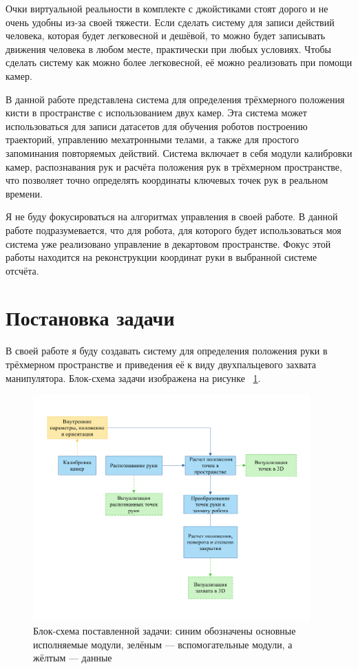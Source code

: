 \documentclass[14pt, a4paper]{extarticle}
\begin{document}
Очки виртуальной реальности в комплекте с джойстиками стоят дорого и не очень
удобны из-за своей тяжести. Если сделать систему для записи действий человека,
которая будет легковесной и дешёвой, то можно будет записывать движения
человека в любом месте, практически при любых условиях. Чтобы сделать систему
как можно более легковесной, её можно реализовать при помощи камер. 

В данной работе представлена система для определения трёхмерного
положения кисти в пространстве с использованием двух камер. Эта система
может использоваться для записи датасетов для обучения роботов построению
траекторий, управлению мехатронными телами, а также для простого
запоминания повторяемых действий. Система включает в себя модули
калибровки камер, распознавания рук и расчёта положения рук в трёхмерном
пространстве, что позволяет точно определять координаты ключевых точек рук в
реальном времени. 

Я не буду фокусироваться на алгоритмах управления в своей работе. В данной
работе подразумевается, что для робота, для которого будет использоваться моя
система уже реализовано управление в декартовом пространстве. Фокус этой работы
находится на реконструкции координат руки в выбранной системе отсчёта.

\section{Постановка задачи}
В своей работе я буду создавать систему для определения положения руки в
трёхмерном пространстве и приведения её к виду двухпальцевого захвата
манипулятора.
Блок-схема задачи изображена на рисунке ~\ref{fig:problem_block_scheme}. 
\begin{figure}[h!]
  \begin{center}
    \includegraphics[width=0.95\textwidth]{images/block-schemes/problem_scheme.png}
  \end{center}
  \caption{
    Блок-схема поставленной задачи: синим обозначены основные
    исполняемые модули, зелёным --- вспомогательные модули, а жёлтым ---
    данные
  }
\label{fig:problem_block_scheme}
\end{figure}
\end{document}

